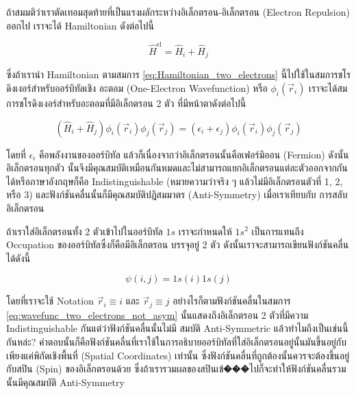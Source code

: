 ถ้าสมมติว่าเราตัดเทอมสุดท้ายที่เป็นแรงผลักระหว่างอิเล็กตรอน-อิเล็กตรอน (Electron Repulsion) ออกไป เราจะได้ Hamiltonian ดังต่อไปนี้

\begin{equation}
  \label{eq:Hamiltonian_two_electrons}
  \hat{H}^{\text{el}}
  =
  \hat{H}_{i} + \hat{H}_{j}
\end{equation}

\noindent ซึ่งถ้าเรานำ Hamiltonian ตามสมการ \eqref{eq:Hamiltonian_two_electrons} นี้ไปใช้ในสมการชโรดิงเงอร์สำหรับออร์บิทัลเชิง%
อะตอม (One-Electron Wavefunction) หรือ $\phi_{i}(\vec{r}_{i})$ เราจะได้สมการชโรดิงเงอร์สำหรับอะตอมที่มีอิเล็กตรอน 2 ตัว
ที่มีหน้าตาดังต่อไปนี้

\begin{equation}
  \left( \hat{H}_{i} + \hat{H}_{j} \right)
  \phi_{i}(\vec{r}_{i})
  \phi_{j}(\vec{r}_{j})
  =
  \left( \epsilon_{i} + \epsilon_{j} \right)
  \phi_{i}(\vec{r}_{i})
  \phi_{j}(\vec{r}_{j})
\end{equation}

\noindent โดยที่ $\epsilon_{i}$ คือพลังงานของออร์บิทัล แล้วก็เนื่องจากว่าอิเล็กตรอนนั้นคือเฟอร์มิออน (Fermion) ดังนั้นอิเล็กตรอนทุกตัว%
นั้นจึงมีคุณสมบัติเหมือนกันหมดและไม่สามารถแยกอิเล็กตรอนแต่ละตัวออกจากกันได้หรือภาษาอังกฤษก็คือ Indistinguishable
(หมายความว่าจริง ๆ แล้วไม่มีอิเล็กตรอนตัวที่ 1, 2, หรือ 3) และฟังก์ชันคลื่นนั้นก็มีคุณสมบัติปฏิสมมาตร (Anti-Symmetry) เมื่อเราเทียบกับ%
การสลับอิเล็กตรอน

ถ้าเราใส่อิเล็กตรอนทั้ง 2 ตัวเข้าไปในออร์บิทัล $1s$ เราจะกำหนดให้ $1 s^2$ เป็นการแทนถึง Occupation ของออร์บิทัลซึ่งก็คือมีอิเล็กตรอน%
บรรจุอยู่ 2 ตัว ดังนั้นเราจะสามารถเขียนฟังก์ชันคลื่นได้ดังนี้

\begin{equation}
  \label{eq:wavefunc_two_electrons_not_asym}
  \psi(i, j) = 1 s(i) 1 s(j)
\end{equation}

\noindent โดยที่เราจะใช้ Notation $\vec{r}_i \equiv i$ และ $\vec{r}_j \equiv j$ อย่างไรก็ตามฟังก์ชันคลื่นในสมการ
\eqref{eq:wavefunc_two_electrons_not_asym} นั้นแสดงถึงอิเล็กตรอน 2 ตัวที่มีความ Indistinguishable กันแต่ว่าฟังก์ชันคลื่นนั้นไม่มี%
สมบัติ Anti-Symmetric แล้วทำไมถึงเป็นเช่นนี้กันหล่ะ? คำตอบนั้นก็คือฟังก์ชันคลื่นที่เราใช้ในการอธิบายออร์บิทัลที่ใส่อิเล็กตรอนอยู่นั้นมันขึ้นอยู่กับ%
เพียงแค่พิกัดเชิงพื้นที่ (Spatial Coordinates) เท่านั้น ซึ่งฟังก์ชันคลื่นที่ถูกต้องนั้นควรจะต้องขึ้นอยู่กับสปิน (Spin) ของอิเล็กตรอนด้วย%
ซึ่งถ้าเรารวมผลของสปินเข้���ไปก็จะทำให้ฟังก์ชันคลื่นรวมนั้นมีคุณสมบัติ Anti-Symmetry

